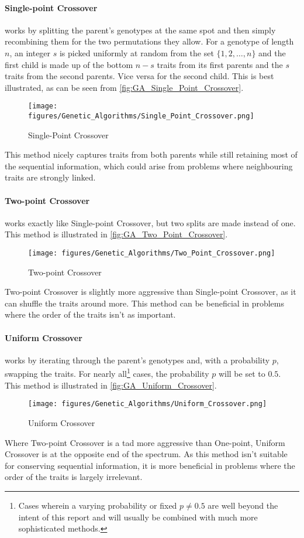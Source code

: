 \paragraph{Single-point Crossover} works by splitting the parent's genotypes at the same spot and then simply recombining them for the two permutations they allow. For a genotype of length $n$, an integer $s$ is picked uniformly at random from the set $\{1, 2, \hdots, n\}$ and the first child is made up of the bottom $n - s$ traits from its first parents and the $s$ traits from the second parents. Vice versa for the second child. This is best illustrated, as can be seen from \autoref{fig:GA_Single_Point_Crossover}.
\begin{figure}[H]
    \centering
    \texttt{[image: figures/Genetic\_Algorithms/Single\_Point\_Crossover.png]}
    \caption{Single-Point Crossover}
    \small
    \raggedright
    \label{fig:GA_Single_Point_Crossover}
\end{figure}
This method nicely captures traits from both parents while still retaining most of the sequential information, which could arise from problems where neighbouring traits are strongly linked.

\paragraph{Two-point Crossover} works exactly like Single-point Crossover, but two splits are made instead of one. This method is illustrated in \autoref{fig:GA_Two_Point_Crossover}.
\begin{figure}[H]
    \centering
    \texttt{[image: figures/Genetic\_Algorithms/Two\_Point\_Crossover.png]}
    \caption{Two-point Crossover}
    \small
    \raggedright
    \label{fig:GA_Two_Point_Crossover}
\end{figure}
Two-point Crossover is slightly more aggressive than Single-point Crossover, as it can shuffle the traits around more. This method can be beneficial in problems where the order of the traits isn't as important.

\paragraph{Uniform Crossover} works by iterating through the parent's genotypes and, with a probability $p$, swapping the traits. For nearly all\footnote{Cases wherein a varying probability or fixed $p \neq 0.5$ are well beyond the intent of this report and will usually be combined with much more sophisticated methods.} cases, the probability $p$ will be set to $0.5$. This method is illustrated in \autoref{fig:GA_Uniform_Crossover}.
\begin{figure}[H]
    \centering
    \texttt{[image: figures/Genetic\_Algorithms/Uniform\_Crossover.png]}
    \caption{Uniform Crossover}
    \small
    \raggedright
    \label{fig:GA_Uniform_Crossover}
\end{figure}
Where Two-point Crossover is a tad more aggressive than One-point, Uniform Crossover is at the opposite end of the spectrum. As this method isn't suitable for conserving sequential information, it is more beneficial in problems where the order of the traits is largely irrelevant.

